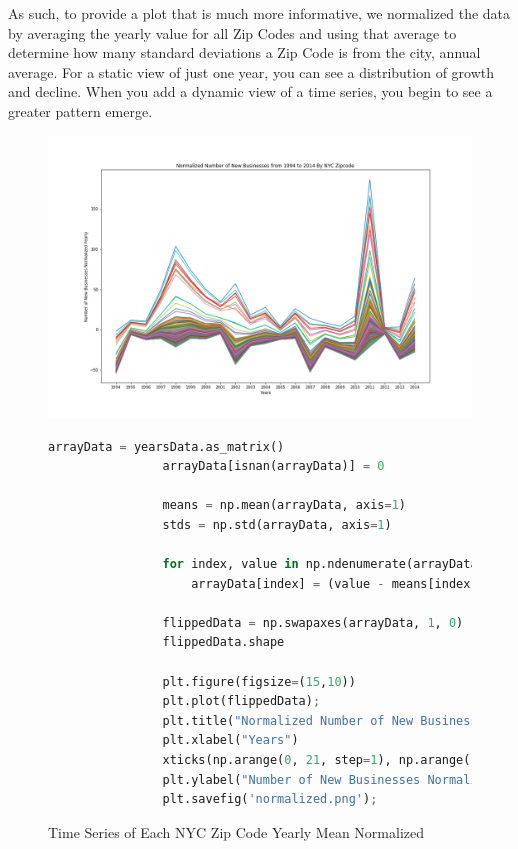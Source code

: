 \documentclass[letter, 11pt]{article} %
\begin{document}
		\noindent As such, to provide a plot that is much more informative, we normalized the data by averaging the yearly value for all Zip Codes and using that average to determine how many standard deviations a Zip Code is from the city, annual average. For a static view of just one year, you can see a distribution of growth and decline. When you add a dynamic view of a time series, you begin to see a greater pattern emerge.
		
		\begin{figure}[H]
			\centering
			\caption{Time Series of Each NYC Zip Code Yearly Mean Normalized}
			\includegraphics[width=\textwidth]{normalized.png}
			\begin{lstlisting}[language=python]
				arrayData = yearsData.as_matrix()
				arrayData[isnan(arrayData)] = 0
				
				means = np.mean(arrayData, axis=1)
				stds = np.std(arrayData, axis=1)
				
				for index, value in np.ndenumerate(arrayData):
					arrayData[index] = (value - means[index[1]]) / stds[index[1]]
				
				flippedData = np.swapaxes(arrayData, 1, 0)
				flippedData.shape
				
				plt.figure(figsize=(15,10))
				plt.plot(flippedData);
				plt.title("Normalized Number of New Businesses from 1994 to 2014 By NYC Zipcode")
				plt.xlabel("Years")
				xticks(np.arange(0, 21, step=1), np.arange(1994, 2015, step=1))
				plt.ylabel("Number of New Businesses Normalized Yearly")
				plt.savefig('normalized.png');
			\end{lstlisting}
		\end{figure}	
		
\end{document}
